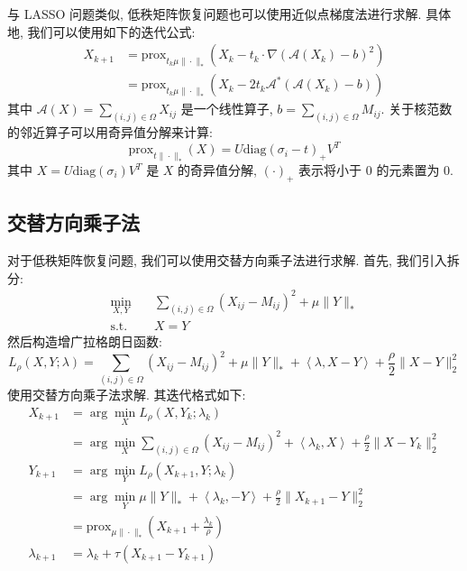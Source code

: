 \documentclass{article}
\begin{document}
与 LASSO 问题类似, 低秩矩阵恢复问题也可以使用近似点梯度法进行求解. 具体地, 我们可以使用如下的迭代公式:
\begin{equation*}
    \begin{aligned}
        X_{k+1} &= \text{prox}_{t_k\mu\|\cdot\|_*}(X_k - t_k \cdot \nabla (\mathcal{A}(X_k)-b)^2)\\
        &= \text{prox}_{t_k\mu\|\cdot\|_*}(X_k - 2 t_k \mathcal{A}^*(\mathcal{A}(X_k)-b))
    \end{aligned}
\end{equation*}
其中 $\mathcal{A}(X) = \sum_{(i,j)\in \Omega} X_{ij}$ 是一个线性算子, $b=\sum_{(i,j)\in \Omega} M_{ij}$. 关于核范数的邻近算子可以用奇异值分解来计算:
\begin{equation*}
    \text{prox}_{t\|\cdot\|_*}(X) = U \text{diag}(\sigma_i - t)_+ V^T
\end{equation*}
其中 $X = U \text{diag}(\sigma_i) V^T$ 是 $X$ 的奇异值分解, $(\cdot)_+$ 表示将小于 0 的元素置为 0.

\subsection{交替方向乘子法}

对于低秩矩阵恢复问题, 我们可以使用交替方向乘子法进行求解. 首先, 我们引入拆分:
\begin{equation*}
    \begin{aligned}
        \min_{X, Y}\quad &\sum_{(i,j)\in \Omega} (X_{ij} - M_{ij})^2 + \mu \|Y\|_*\\
        \text{s.t.}\quad & X = Y
    \end{aligned}
\end{equation*}
然后构造增广拉格朗日函数:
\begin{equation*}
    L_\rho(X, Y; \lambda) = \sum_{(i,j)\in \Omega} (X_{ij} - M_{ij})^2 + \mu \|Y\|_* + \left<\lambda, X - Y\right> + \frac{\rho}{2}\|X - Y\|_2^2
\end{equation*}
使用交替方向乘子法求解. 其迭代格式如下:
\begin{align*}
    X_{k+1} &= \arg \min_{X} L_\rho(X, Y_k; \lambda_k)\\
    & = \arg \min_{X} \sum_{(i,j)\in \Omega} (X_{ij} - M_{ij})^2 + \left<\lambda_k, X\right> + \frac{\rho}{2}\|X - Y_k\|_2^2\\
    Y_{k+1} &= \arg \min_{Y} L_\rho(X_{k+1}, Y; \lambda_k)\\
    & = \arg \min_{Y} \mu \|Y\|_* + \left<\lambda_k, -Y\right> + \frac{\rho}{2}\|X_{k+1} - Y\|_2^2\\
    & =\text{prox}_{\mu\|\cdot\|_*}(X_{k+1} + \frac{\lambda_k}{\rho})\\
    \lambda_{k+1} &= \lambda_k + \tau(X_{k+1} - Y_{k+1})
\end{align*}
\end{document}
